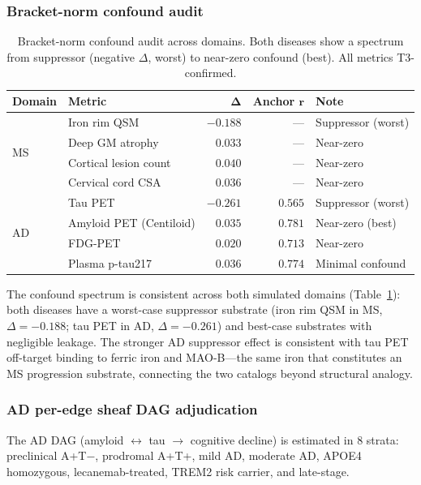 \documentclass[11pt]{article}
\begin{document}
\subsubsection{Bracket-norm confound audit}

\begin{table}[t]
\centering
\caption{Bracket-norm confound audit across domains. Both diseases show a spectrum from suppressor (negative $\Delta$, worst) to near-zero confound (best). All metrics T3-confirmed.}
\label{tab:p1-cross}
\small
\begin{tabular}{@{}llrrl@{}}
\toprule
\textbf{Domain} & \textbf{Metric} & $\boldsymbol{\Delta}$ & \textbf{Anchor} $\boldsymbol{r}$ & \textbf{Note} \\
\midrule
\multirow{4}{*}{MS}
& Iron rim QSM & $-0.188$ & --- & Suppressor (worst) \\
& Deep GM atrophy & $0.033$ & --- & Near-zero \\
& Cortical lesion count & $0.040$ & --- & Near-zero \\
& Cervical cord CSA & $0.036$ & --- & Near-zero \\
\midrule
\multirow{4}{*}{AD}
& Tau PET & $-0.261$ & $0.565$ & Suppressor (worst) \\
& Amyloid PET (Centiloid) & $0.035$ & $0.781$ & Near-zero (best) \\
& FDG-PET & $0.020$ & $0.713$ & Near-zero \\
& Plasma p-tau217 & $0.036$ & $0.774$ & Minimal confound \\
\bottomrule
\end{tabular}
\end{table}

The confound spectrum is consistent across both simulated domains (Table~\ref{tab:p1-cross}): both diseases have a worst-case suppressor substrate (iron rim QSM in MS, $\Delta = -0.188$; tau PET in AD, $\Delta = -0.261$) and best-case substrates with negligible leakage.
The stronger AD suppressor effect is consistent with tau PET off-target binding to ferric iron and MAO-B---the same iron that constitutes an MS progression substrate, connecting the two catalogs beyond structural analogy.

\subsubsection{AD per-edge sheaf DAG adjudication}

The AD DAG (amyloid $\leftrightarrow$ tau $\to$ cognitive decline) is estimated in 8 strata: preclinical A+T$-$, prodromal A+T+, mild AD, moderate AD, APOE4 homozygous, lecanemab-treated, TREM2 risk carrier, and late-stage.
\end{document}
